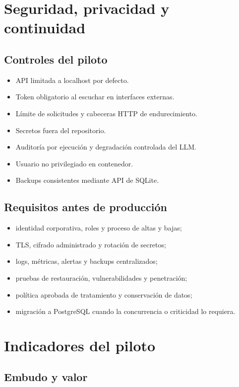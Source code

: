 \documentclass[11pt,a4paper]{article}
\begin{document}
\section{Seguridad, privacidad y continuidad}

\subsection{Controles del piloto}

\begin{itemize}
  \item API limitada a localhost por defecto.
  \item Token obligatorio al escuchar en interfaces externas.
  \item Límite de solicitudes y cabeceras HTTP de endurecimiento.
  \item Secretos fuera del repositorio.
  \item Auditoría por ejecución y degradación controlada del LLM.
  \item Usuario no privilegiado en contenedor.
  \item Backups consistentes mediante API de SQLite.
\end{itemize}

\subsection{Requisitos antes de producción}

\begin{itemize}
  \item identidad corporativa, roles y proceso de altas y bajas;
  \item TLS, cifrado administrado y rotación de secretos;
  \item logs, métricas, alertas y backups centralizados;
  \item pruebas de restauración, vulnerabilidades y penetración;
  \item política aprobada de tratamiento y conservación de datos;
  \item migración a PostgreSQL cuando la concurrencia o criticidad lo requiera.
\end{itemize}

\section{Indicadores del piloto}

\subsection{Embudo y valor}
\end{document}
